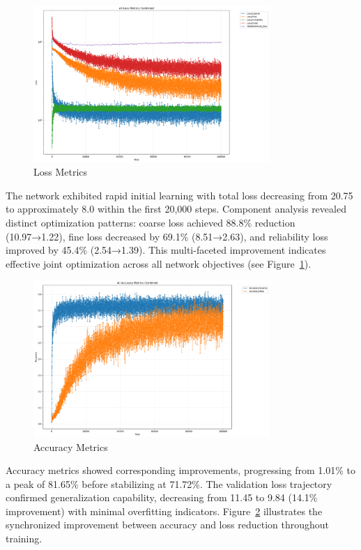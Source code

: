 \begin{figure}[H]
    \centering
    \includegraphics[width=0.8\textwidth]{ressources/loss_3.png}
    \caption{Loss Metrics}
    \label{fig:loss_components}
\end{figure}
The network exhibited rapid initial learning with total loss decreasing from 20.75 to approximately 8.0 within the first 20,000 steps. Component analysis revealed distinct optimization patterns: coarse loss achieved 88.8\% reduction (10.97→1.22), fine loss decreased by 69.1\% (8.51→2.63), and reliability loss improved by 45.4\% (2.54→1.39). This multi-faceted improvement indicates effective joint optimization across all network objectives (see Figure~\ref{fig:loss_components}).
\begin{figure}[H]
    \centering
    \includegraphics[width=0.8\textwidth]{ressources/accuracy_3.png}
    \caption{Accuracy Metrics}
    \label{fig:accuracy_metrics3}
\end{figure}

Accuracy metrics showed corresponding improvements, progressing from 1.01\% to
a peak of 81.65\% before stabilizing at 71.72\%. The validation loss trajectory
confirmed generalization capability, decreasing from 11.45 to 9.84 (14.1\%
improvement) with minimal overfitting indicators.
Figure~\ref{fig:accuracy_metrics3} illustrates the synchronized improvement
between accuracy and loss reduction throughout training.

